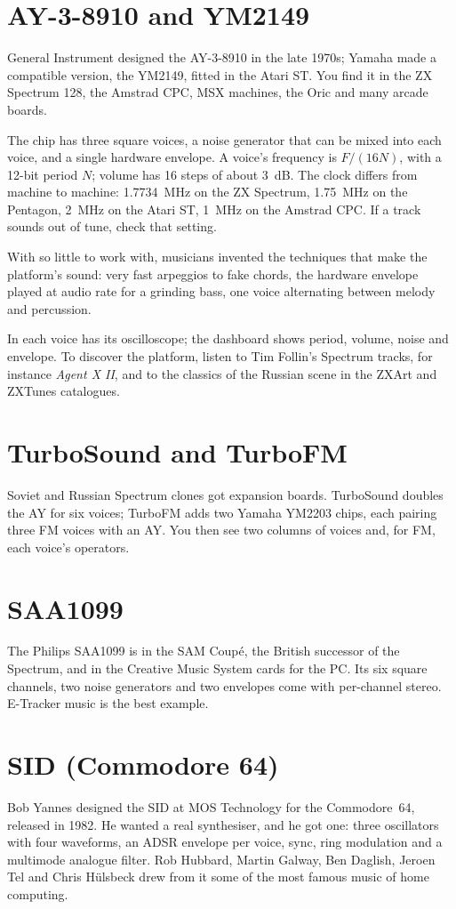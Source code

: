 \section{AY-3-8910 and YM2149}
General Instrument designed the AY-3-8910 in the late 1970s; Yamaha made a compatible version, the YM2149, fitted
in the Atari ST. You find it in the ZX Spectrum 128, the Amstrad CPC, MSX machines, the Oric and many arcade boards.

The chip has three square voices, a noise generator that can be mixed into each voice, and a single hardware
envelope. A voice's frequency is $F/(16N)$, with a 12-bit period $N$; volume has 16 steps of about 3~dB. The clock
differs from machine to machine: 1.7734~MHz on the ZX Spectrum, 1.75~MHz on the Pentagon, 2~MHz on the Atari ST,
1~MHz on the Amstrad CPC. If a track sounds out of tune, check that setting.

With so little to work with, musicians invented the techniques that make the platform's sound: very fast arpeggios to
fake chords, the hardware envelope played at audio rate for a grinding bass, one voice alternating between melody and
percussion.

In \soft each voice has its oscilloscope; the dashboard shows period, volume, noise and envelope. To discover the
platform, listen to Tim Follin's Spectrum tracks, for instance \emph{Agent X II}, and to the classics of the Russian
scene in the ZXArt and ZXTunes catalogues.

\section{TurboSound and TurboFM}
Soviet and Russian Spectrum clones got expansion boards. TurboSound doubles the AY for six voices; TurboFM adds two
Yamaha YM2203 chips, each pairing three FM voices with an AY. You then see two columns of voices and, for FM, each
voice's operators.

\section{SAA1099}
The Philips SAA1099 is in the SAM Coupé, the British successor of the Spectrum, and in the Creative Music System cards
for the PC. Its six square channels, two noise generators and two envelopes come with per-channel stereo. E-Tracker
music is the best example.

\section{SID (Commodore 64)}
Bob Yannes designed the SID at MOS Technology for the Commodore~64, released in 1982. He wanted a real synthesiser,
and he got one: three oscillators with four waveforms, an ADSR envelope per voice, sync, ring modulation and a
multimode analogue filter. Rob Hubbard, Martin Galway, Ben Daglish, Jeroen Tel and Chris Hülsbeck drew from it some
of the most famous music of home computing.

